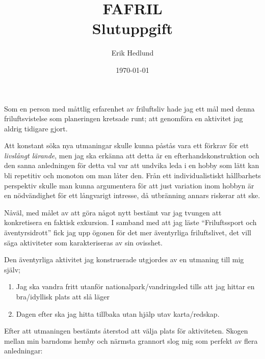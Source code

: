 \documentclass[12pt]{article}   %
\begin{document}
\onehalfspacing %

\title{%
    FAFRIL\\
    \smallskip
    \Large Slutuppgift
}   %
\author{Erik Hedlund}         %
\date{\today}    %
\maketitle

Som en person med måttlig erfarenhet av friluftsliv hade jag ett mål med denna
friluftsvistelse som planeringen kretsade runt; att genomföra en aktivitet
jag aldrig tidigare gjort.

Att konstant söka nya utmaningar skulle kunna påstås vara ett förkrav för
ett \textit{livslångt lärande}, %
men jag ska erkänna att detta är en efterhandskonstruktion och den sanna anledningen
för detta val var att undvika leda i en hobby som lätt kan bli repetitiv och monoton
om man låter den. Från ett individualistiskt hållbarhets perspektiv skulle man kunna
argumentera för att just variation inom hobbyn är en nödvändighet för ett långvarigt
intresse, då utbränning annars riskerar att ske.

Nåväl, med målet av att göra något nytt bestämt var jag tvungen att konkretisera
en faktisk exkursion. I samband med att jag läste ``Friluftssport och äventyrsidrott''
fick jag upp ögonen för det mer äventyrliga friluftslivet, det vill säga aktiviteter
som karakteriseras av sin ovisshet\cite{sandell2011friluftssport}.

Den äventyrliga aktivitet jag konstruerade utgjordes av en utmaning till mig själv;

\begin{enumerate}
        \item Jag ska vandra fritt utanför nationalpark/vandringsled tills att jag hittar en bra/idyllisk plats att slå läger
        \item Dagen efter ska jag hitta tillbaka utan hjälp utav karta/redskap.
\end{enumerate}

Efter att utmaningen bestämts återstod att välja plats för aktiviteten. Skogen mellan
min barndoms hemby och närmsta grannort slog mig som perfekt av flera anledningar:
\end{document}
